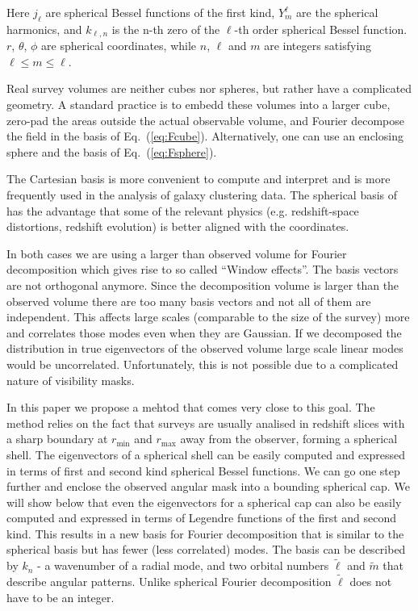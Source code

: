 \documentclass[fleqn,usenatbib]{mnras}
\begin{document}
Here $j_\ell$ are spherical Bessel functions of the first kind, $Y^\ell_m$ are the
spherical harmonics, and $k_{\ell,n}$ is the n-th zero of the $\ell$-th order
spherical Bessel function. $r$, $\theta$, $\phi$ are spherical coordinates,
while $n$, $\ell$ and $m$ are integers satisfying $\ell \leq m \leq \ell$.

Real survey volumes are neither cubes nor spheres, but rather have a complicated
geometry. A standard practice is to embedd these volumes into a larger cube,
zero-pad the areas outside the actual observable volume, and Fourier decompose the
field in the basis of Eq.~(\ref{eq:Fcube}). Alternatively, one can use an
enclosing sphere and the basis of Eq.~(\ref{eq:Fsphere}).

The Cartesian basis is more convenient to compute and interpret and
is more frequently used in the analysis of galaxy clustering data. The spherical
basis of has the advantage that some of the relevant physics (e.g. redshift-space
distortions, redshift evolution) is better aligned with the coordinates.

In both cases we are using a larger than observed volume for Fourier
decomposition which gives rise to so called ``Window effects''. The basis vectors
are not orthogonal anymore. Since the decomposition volume is larger than the
observed volume there are too many basis vectors and not all of them are
independent. This affects large scales (comparable to the size of the survey) more
and correlates those modes even when they are Gaussian. If we decomposed the
distribution in true eigenvectors of the observed volume large scale linear modes
would be uncorrelated. Unfortunately, this is not possible due to a complicated
nature of visibility masks.

In this paper we propose a mehtod that comes very close to this goal. The method
relies on the fact that surveys are usually analised in redshift slices with a
sharp boundary at $r_\mathrm{min}$ and $r_\mathrm{max}$ away from the observer,
forming a spherical shell. The  eigenvectors of a spherical shell
can be easily computed and expressed in terms of first and second kind spherical
Bessel functions. We can go one step further and enclose the observed angular mask
into a bounding spherical cap. We will show below that even the 
eigenvectors for a spherical cap can also be easily computed and expressed in
terms of Legendre functions of the first and second kind. This results in a new
basis for Fourier decomposition that is similar to the spherical basis but has
fewer (less correlated) modes. The basis can be described by $k_n$ - a wavenumber
of a radial mode, and two orbital numbers $\tilde{\ell}$ and $\tilde{m}$ that
describe angular patterns. Unlike spherical Fourier decomposition $\tilde{\ell}$
does not have to be an integer.
\end{document}
